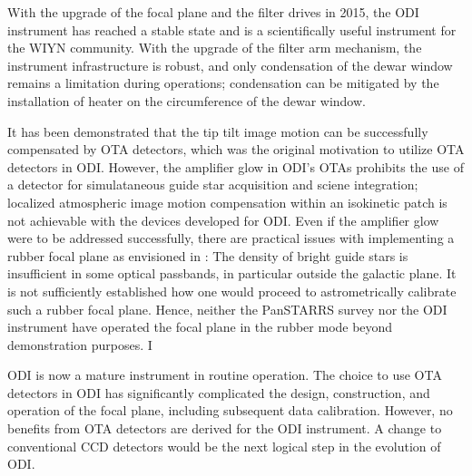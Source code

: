 \documentclass[]{spieman}
\begin{document}
With the upgrade of the focal plane and the filter drives in 2015, the ODI
instrument has reached a stable state and is a scientifically useful instrument
for the WIYN community. With the upgrade of the filter arm mechanism, the
instrument infrastructure is robust, and only condensation of the dewar window
remains a limitation during  operations; condensation can be mitigated by the 
installation of heater on the circumference of the dewar window.

It has been demonstrated  that the tip tilt image motion can be
successfully compensated by OTA detectors, which was the original motivation to 
utilize OTA detectors in ODI.  However, the amplifier glow in ODI's OTAs 
prohibits the use of a detector for simulataneous guide star acquisition and 
sciene integration; localized atmospheric image motion compensation within an 
isokinetic patch is not achievable with the devices developed for ODI. Even 
if the amplifier glow were to be addressed
successfully, there are practical issues with implementing a rubber focal plane
as envisioned in \cite{tonry2002}: The density of  bright guide stars is
insufficient in some  optical passbands, in particular outside the galactic
plane. It is not sufficiently established how one would proceed to
astrometrically calibrate such a rubber focal plane.  Hence, neither the 
PanSTARRS survey nor the ODI instrument have operated the focal plane in the 
rubber mode beyond demonstration purposes.  I

ODI is now a mature instrument in routine operation. The choice to use  OTA 
detectors in ODI has significantly complicated the design, construction, and 
operation of the focal plane, including subsequent data calibration. However, 
no benefits from OTA detectors are derived for the ODI instrument. A change to 
conventional CCD detectors would be the next logical step in the evolution of 
ODI.
 
 

\end{document}
